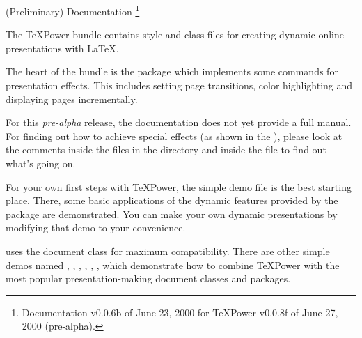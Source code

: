 %
% 
%
%
%
%
%
%
%
%
%
%

%
\makeslidetitle
{%
  (Preliminary) Documentation%
  \thanks{Documentation v0.0.6b of June 23, 2000 for \TeX Power v0.0.8f of June 27, 2000 (pre-alpha).}%
  }%

The \TeX Power bundle contains style and class files for creating dynamic online presentations with \LaTeX. 

The heart of the bundle is the package  which implements some commands for presentation effects. This
includes setting page transitions, color highlighting and displaying pages incrementally.

For this \emph{pre-alpha} release, the documentation does not yet provide a full manual. For finding out how to achieve
special effects (as shown in the ), please look at the comments inside the  files in the
 directory and inside the file  to find out what's going on.

\newslide

For your own first steps with \TeX Power, the simple demo file  is the best starting
place. There, some basic applications of the dynamic features provided by the  package are
demonstrated. You can make your own dynamic presentations by modifying that demo to your convenience.

 uses the  document class for maximum compatibility. There are other simple demos
named , , , , , ,
 which demonstrate how to combine \TeX Power with the most popular presentation-making document classes
and packages.

